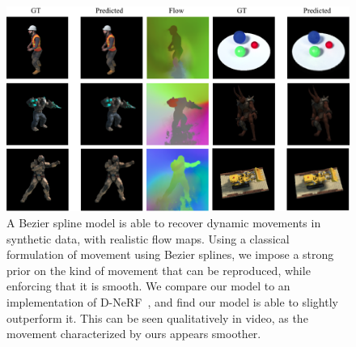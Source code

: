 \documentclass[runningheads]{llncs}
\begin{document}
\begin{figure}
    \centering
    \includegraphics[width=\textwidth]{teaser}
    \caption{
    \label{fig:intro_figure}
    A Bezier spline model is able to recover dynamic movements in synthetic data, with realistic flow maps. Using a classical formulation of movement using Bezier splines, we impose a strong prior on the kind of movement that can be reproduced, while enforcing that it is smooth. We compare our model to an implementation of D-NeRF~\cite{pumarola2020dnerf}, and find our model is able to slightly outperform it. This can be seen qualitatively in video, as the movement characterized by ours appears smoother.
    }
\end{figure}








{\small
    
    
}
\end{document}
